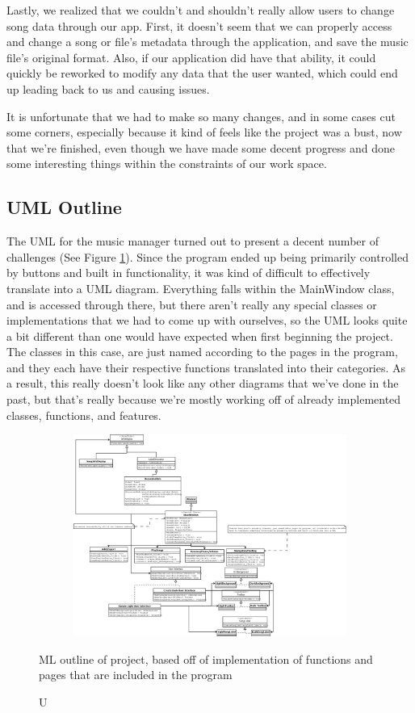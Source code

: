 \documentclass[10pt,conference,onecolumn,compsoc]{IEEEtran}
\begin{document}
Lastly, we realized that we couldn't and shouldn't really allow users to change song data through our app. First, it doesn't seem that we can properly access and change a song or file's metadata through the application, and save the music file's original format. Also, if our application did have that ability, it could quickly be reworked to modify any data that the user wanted, which could end up leading back to us and causing issues.

It is unfortunate that we had to make so many changes, and in some cases cut some corners, especially because it kind of feels like the project was a bust, now that we're finished,
even though we have made some decent progress and done some interesting things within the constraints of our work space.

\subsection{UML Outline}
The UML for the music manager turned out to present a decent number of challenges (See Figure \ref{UMLOutline}). Since the program ended up being primarily controlled by buttons and built in functionality, it was kind of difficult to effectively translate into a UML diagram. Everything falls within the MainWindow class, and is accessed through there, but there aren't really any special classes or implementations that we had to come up with ourselves, so the UML looks quite a bit different than one would have expected when first beginning the project. The classes in this case, are just named according to the pages in the program, and they each have their respective functions translated into their categories. As a result, this really doesn't look like any other diagrams that we've done in the past, but that's really because we're mostly working off of already implemented classes, functions, and features.

\begin{figure}
\includegraphics[height=250px, width=450px]{Manager_UML.png}
\caption UML outline of project, based off of implementation of functions and pages that are included in the program
\label{UMLOutline}
\end{figure}
\end{document}
